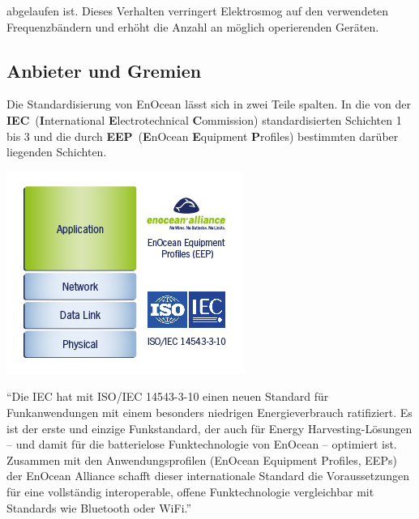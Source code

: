 \begin{multicols}{3}

abgelaufen ist. Dieses Verhalten verringert Elektrosmog auf den verwendeten Frequenzbändern und erhöht die Anzahl an möglich operierenden Geräten.~\cite{enocean.1}

\subsection*{Anbieter und Gremien}
Die Standardisierung von EnOcean lässt sich in zwei Teile spalten. In die von der \textbf{IEC}~(\textbf{I}nternational \textbf{E}lectrotechnical \textbf{C}ommission) standardisierten Schichten 1 bis 3 und die durch  \textbf{EEP}~(\textbf{E}nOcean \textbf{E}quipment \textbf{P}rofiles) bestimmten darüber liegenden Schichten. 

\begin{Figure}
\includegraphics[width=\linewidth]{Kapitel/EnOcean/Grafiken/iso_iec_standard.jpg}
\end{Figure}

\enquote{Die IEC hat mit ISO/IEC 14543-3-10 einen neuen Standard für Funkanwendungen mit einem besonders niedrigen Energieverbrauch ratifiziert. Es ist der erste und einzige Funkstandard, der auch für Energy Harvesting-Lösungen – und damit für die batterielose Funktechnologie von EnOcean – optimiert ist. Zusammen mit den Anwendungsprofilen (EnOcean Equipment Profiles, EEPs) der EnOcean Alliance schafft dieser internationale Standard die Voraussetzungen für eine vollständig interoperable, offene Funktechnologie vergleichbar mit Standards wie Bluetooth oder WiFi.}~\cite{enocean.9}


\end{multicols}
